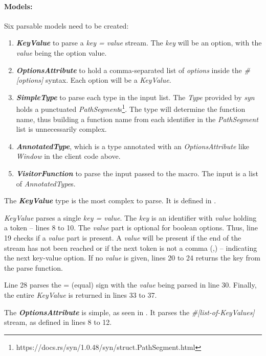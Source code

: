 \paragraph{Models:}
Six parsable models need to be created:
\begin{enumerate}
	\item \textbf{\textit{KeyValue}} to parse a \textit{key = value} stream.
	      The \textit{key} will be an option, with the \textit{value} being the option value.
	\item \textbf{\textit{OptionsAttribute}} to hold a comma-separated list of \textit{options} inside the \textit{\#[options]} syntax.
	      Each option will be a \textit{KeyValue}.
	\item \textbf{\textit{SimpleType}} to parse each type in the input list.
	      The \textit{Type} provided by \textit{syn} holds a punctuated \textit{PathSegment}s\footnote{https://docs.rs/syn/1.0.48/syn/struct.PathSegment.html}.
	      The type will determine the function name, thus building a function name from each identifier in the \textit{PathSegment} list is unnecessarily complex.
	\item \textbf{\textit{AnnotatedType}}, which is a type annotated with an \textit{OptionsAttribute} like \textit{Window} in the client code above.
	\item \textbf{\textit{VisitorFunction}} to parse the input passed to the macro.
	      The input is a list of \textit{AnnotatedType}s.
\end{enumerate}

The \textbf{\textit{KeyValue}} type is the most complex to parse.
It is defined in .

\textit{KeyValue} parses a single \textit{key = value}.
The \textit{key} is an identifier with \textit{value} holding a token -- lines 8 to 10.
The \textit{value} part is optional for boolean options.
Thus, line 19 checks if a \textit{value} part is present.
A \textit{value} will be present if the end of the stream has not been reached or if the next token is not a comma (,) -- indicating the next key-value option.
If no \textit{value} is given, lines 20 to 24 returns the key from the parse function.

Line 28 parses the = (equal) sign with the \textit{value} being parsed in line 30.
Finally, the entire \textit{KeyValue} is returned in lines 33 to 37.

The \textbf{\textit{OptionsAttribute}} is simple, as seen in .
It parses the \textit{\#[list-of-KeyValues]} stream, as defined in lines 8 to 12.

